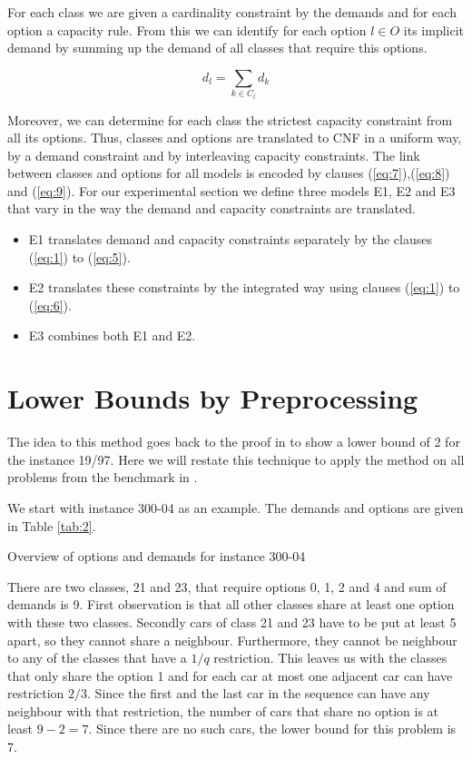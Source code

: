 \documentclass[]{llncs}
\begin{document}
For each class we are given a cardinality constraint by the demands and for each option a capacity rule. From this we
can identify for each option $l \in O$ its implicit demand by summing up the demand of all classes that require this options.

$$ d_l = \sum_{k\in C_l} d_k$$

Moreover, we can determine for each class the strictest capacity constraint from all its options. Thus, classes and
options are translated to CNF in a uniform way, by a demand constraint and by interleaving capacity constraints. The
link between classes and options for all models is encoded by clauses (\ref{eq:7}),(\ref{eq:8}) and (\ref{eq:9}). For
our experimental section we define three models E1, E2 and E3 that vary in the way the demand and capacity constraints
are translated. 

\begin{itemize}
    \item E1 translates demand and capacity constraints separately by the clauses (\ref{eq:1}) to (\ref{eq:5}). 
    \item E2 translates these constraints by the integrated way using clauses (\ref{eq:1}) to (\ref{eq:6}).
    \item E3 combines both E1 and E2. 
\end{itemize}

\section{Lower Bounds by Preprocessing}
\label{sec:lower}

The idea to this method goes back to the proof in \cite{Gent98} to show a lower bound of 2 for the instance 19/97. Here
we will restate this technique to apply the method on all problems from the benchmark in \cite{Gravel05}. 

We start with instance 300-04 as an example. The demands and options are given in Table \ref{tab:2}. 

\begin{table}[htbp]
    \caption{Overview of options and demands for instance 300-04}
    \centering
    
    \label{tab:2}
\end{table}

There are two classes, 21 and 23, that require options 0, 1, 2 and 4 and sum of demands is 9. First observation is that
all other classes share at least one option with these two classes.  Secondly cars of class 21 and 23 have to be put at
least 5 apart, so they cannot share a neighbour. Furthermore, they cannot be neighbour to any of the classes that have a
$1/q$ restriction. This leaves us with the classes that only share the option 1 and for each car at most one adjacent
car can have restriction $2/3$. Since the first and the last car in the sequence can have any neighbour with that
restriction, the number of cars that share no option is at least $9-2=7$. Since there are no such cars, the lower bound
for this problem is 7. 
\end{document}
